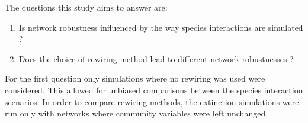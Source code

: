 \documentclass[12pt,a4paper]{article}
\begin{document}
The questions this study aims to answer are:
\begin{enumerate}
\item Is network robustness influenced by the way species interactions are simulated ?
\item Does the choice of rewiring method lead to different network robustnesses ?
\end{enumerate}


For the first question only simulations where no rewiring was used were considered. This allowed for unbiased comparisons between the species interaction scenarios. In order to compare rewiring methods, the extinction simulations were run only with networks where community variables were left unchanged.



%	
\end{document}
